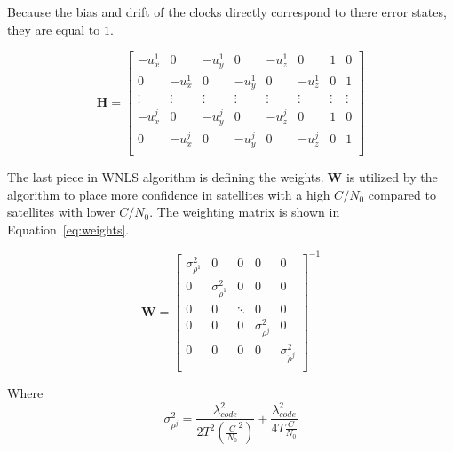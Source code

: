 Because the bias and drift of the clocks directly correspond to there error states, they are equal to \(1\).

\begin{equation}\label{eq:Hmat}
    \mathbf{H} =
    \begin{bmatrix}
        -u_x^1 & 0      & -u_y^1 & 0      & -u_z^1 & 0      & 1      & 0      \\
        0      & -u_x^1 & 0      & -u_y^1 & 0      & -u_z^1 & 0      & 1      \\
        \vdots & \vdots & \vdots & \vdots & \vdots & \vdots & \vdots & \vdots \\
        -u_x^j & 0      & -u_y^j & 0      & -u_z^j & 0      & 1      & 0      \\
        0      & -u_x^j & 0      & -u_y^j & 0      & -u_z^j & 0      & 1      \\
    \end{bmatrix}
\end{equation}

The last piece in WNLS algorithm is defining the weights.\( \; \mathbf{W}\) is utilized by the algorithm to place more confidence in satellites with a high \(C/N_0\) compared to satellites with lower \(C/N_0\). The weighting matrix is shown in Equation~\ref{eq:weights}.

\begin{equation}\label{eq:weights}
    \mathbf{W} = \begin{bmatrix}
        \sigma^2_{\rho^1} & 0                       & 0      & 0                 & 0                       \\
        0                 & \sigma^2_{\dot{\rho}^1} & 0      & 0                 & 0                       \\
        0                 & 0                       & \ddots & 0                 & 0                       \\
        0                 & 0                       & 0      & \sigma^2_{\rho^j} & 0                       \\
        0                 & 0                       & 0      & 0                 & \sigma^2_{\dot{\rho}^j} \\
    \end{bmatrix}^{-1}
\end{equation}

Where
\begin{equation}\label{eq:psrVar}
    \sigma^2_{\rho^j} = \frac{\lambda^2_{code}}{2T^2{\left(\frac{C}{N_0}^2\right)}} + \frac{\lambda^2_{code}}{4T\frac{C}{N_0}}
\end{equation}

